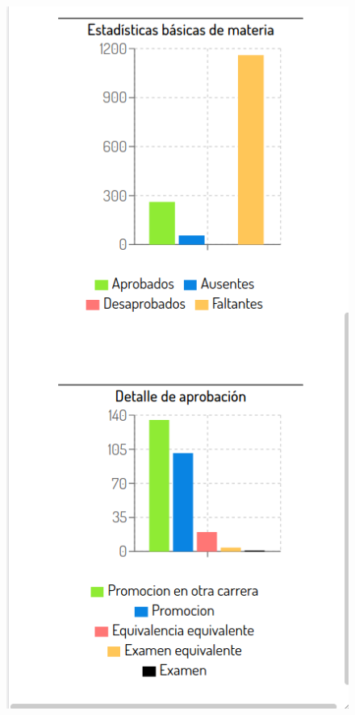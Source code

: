 \begin{figure}[!htbp]
  \centering
    \includegraphics[scale=0.3]{images/seguimiento-academico/sa-mobile-materias.png}
  \label{fig:sa-materia-mobile}
\end{figure}